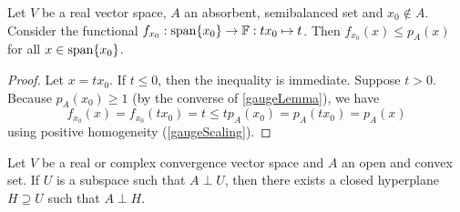 \begin{lemma} \label{gaugeSeparationLemma}
Let $V$ be a real vector space, $A$ an absorbent, semibalanced set and $x_0 \notin A$. Consider the functional $f_{x_0}: \operatorname{span}\{x_0\}\to \mathbb{F}: tx_0 \mapsto t$. Then $f_{x_0}(x)\leq p_A(x)$ for all $x\in \operatorname{span}\{x_0\}$.
\end{lemma}
\begin{proof}
Let $x = tx_0$. If $t\leq 0$, then the inequality is immediate. Suppose $t>0$. Because $p_A(x_0) \geq 1$ (by the converse of \ref{gaugeLemma}), we have
\[ f_{x_0}(x) = f_{x_0}(tx_0) = t \leq tp_A(x_0) = p_A(tx_0) = p_A(x)  \]
using positive homogeneity (\ref{gaugeScaling}).
\end{proof}

\begin{theorem}[Mazur] \label{MazurTheorem}
Let $V$ be a real or complex convergence vector space and $A$ an open and convex set. If $U$ is a subspace such that $A\perp U$, then there exists a closed hyperplane $H \supseteq U$ such that $A\perp H$.
\end{theorem}
